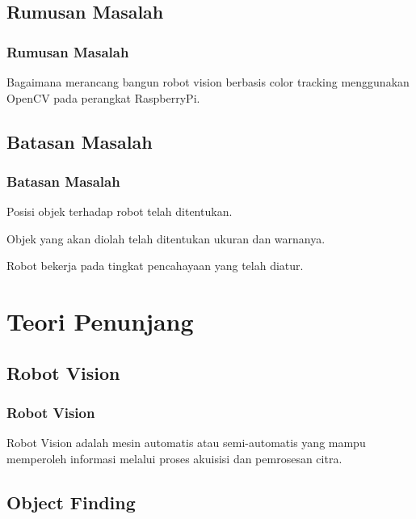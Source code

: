 \documentclass[table,dvipsnames]{beamer}
\begin{document}
\subsection{Rumusan Masalah}

\begin{frame}
\frametitle{Rumusan Masalah}
\begin{block}{}
Bagaimana merancang bangun robot vision berbasis color tracking menggunakan OpenCV pada perangkat RaspberryPi.
\end{block}
\end{frame}

\subsection{Batasan Masalah}

\begin{frame}
\frametitle{Batasan Masalah}
\begin{block}{}
Posisi objek terhadap robot telah ditentukan.
\end{block}
\begin{block}{}
Objek yang akan diolah telah ditentukan ukuran dan warnanya.
\end{block}
\begin{block}{}
Robot bekerja pada tingkat pencahayaan yang telah diatur.
\end{block}
\end{frame}


\section{Teori Penunjang}

\subsection{Robot Vision}

\begin{frame}
\frametitle{Robot Vision}
\begin{block}{\cite{robot_vis}}
 Robot Vision adalah mesin automatis atau semi-automatis yang mampu memperoleh informasi melalui proses akuisisi dan pemrosesan citra.
\end{block}
\end{frame}


\subsection{Object Finding}
\end{document}
